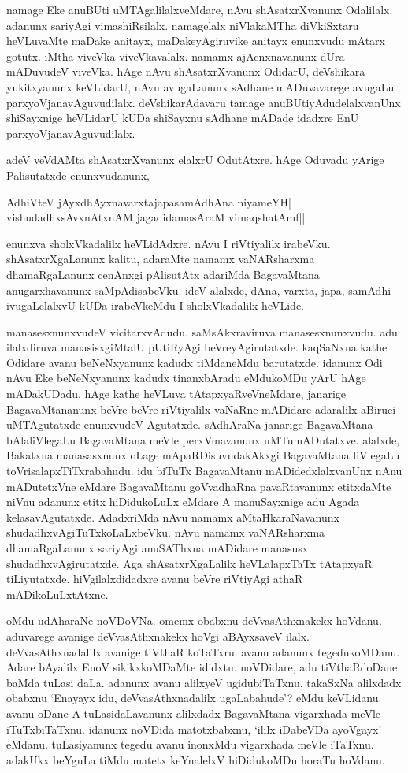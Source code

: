 namage Eke anuBUti uMTAgalilalxveMdare, nAvu shAsatxrXvanunx Odalilalx. adanunx sariyAgi vimashiRsilalx. namagelalx niVlakaMTha diVkiSxtaru heVLuvaMte maDake anitayx, maDakeyAgiruvike anitayx enunxvudu mAtarx gotutx. iMtha viveVka viveVkavalalx. namamx ajAcnxnavanunx dUra mADuvudeV viveVka. hAge nAvu shAsatxrXvanunx OdidarU, deVshikara yukitxyanunx keVLidarU, nAvu avugaLanunx sAdhane mADuvavarege avugaLu parxyoVjanavAguvudilalx. deVshikarAdavaru tamage anuBUtiyAdudelalxvanUnx shiSayxnige heVLidarU kUDa shiSayxnu sAdhane mADade idadxre EnU parxyoVjanavAguvudilalx.

adeV veVdAMta shAsatxrXvanunx elalxrU OdutAtxre. hAge Oduvadu yArige Palisutatxde enunxvudanunx,

\begin{shloka}
AdhiVteV jAyxdhAyxnavarxtajapasamAdhAna niyameYH|\\
vishudadhxsAvxnAtxnAM jagadidamasAraM vimaqshatAmf||
\end{shloka}

\noindent enunxva sholxVkadalilx heVLidAdxre. nAvu I riVtiyalilx irabeVku. shAsatxrXgaLanunx kalitu, adaraMte namamx vaNARsharxma dhamaRgaLanunx cenAnxgi pAlisutAtx adariMda BagavaMtana anugarxhavanunx saMpAdisabeVku. ideV alalxde, dAna, varxta, japa, samAdhi ivugaLelalxvU kUDa irabeVkeMdu I sholxVkadalilx heVLide.

manasesxnunxvudeV vicitarxvAdudu. saMsAkxraviruva manasesxnunxvudu. adu ilalxdiruva manasisxgiMtalU pUtiRyAgi beVreyAgirutatxde. kaqSaNxna kathe Odidare avanu beNeNxyanunx kadudx tiMdaneMdu barutatxde. idanunx Odi nAvu Eke beNeNxyanunx kadudx tinanxbAradu eMdukoMDu yArU hAge mADakUDadu. hAge kathe heVLuva tAtapxyaRveVneMdare, janarige BagavaMtananunx beVre beVre riVtiyalilx vaNaRne mADidare adaralilx aBiruci uMTAgutatxde enunxvudeV Agutatxde. sAdhAraNa janarige BagavaMtana bAlaliVlegaLu BagavaMtana meVle perxVmavanunx uMTumADutatxve. alalxde, Bakatxna manasasxnunx oLage mApaRDisuvudakAkxgi BagavaMtana liVlegaLu toVrisalapxTiTxrabahudu. idu biTuTx BagavaMtanu mADidedxlalxvanUnx nAnu mADutetxVne eMdare BagavaMtanu goVvadhaRna pavaRtavanunx etitxdaMte niVnu adanunx etitx hiDidukoLuLx eMdare A manuSayxnige adu Agada kelasavAgutatxde. AdadxriMda nAvu namamx aMtaHkaraNavanunx shudadhxvAgiTuTxkoLaLxbeVku. nAvu namamx vaNARsharxma dhamaRgaLanunx sariyAgi anuSAThxna mADidare manasusx shudadhxvAgirutatxde. Aga shAsatxrXgaLalilx heVLalapxTaTx tAtapxyaR tiLiyutatxde. hiVgilalxdidadxre avanu beVre riVtiyAgi athaR mADikoLuLxtAtxne.

oMdu udAharaNe noVDoVNa. omemx obabxnu deVvasAthxnakekx hoVdanu. aduvarege avanige deVvasAthxnakekx hoVgi aBAyxsaveV ilalx. deVvasAthxnadalilx avanige tiVthaR koTaTxru. avanu adanunx tegedukoMDanu. Adare bAyalilx EnoV sikikxkoMDaMte ididxtu. noVDidare, adu tiVthaRdoDane baMda tuLasi daLa. adanunx avanu alilxyeV ugidubiTaTxnu. takaSxNa alilxdadx obabxnu `Enayayx idu, deVvasAthxnadalilx ugaLabahude'? eMdu keVLidanu. avanu oDane A tuLasidaLavanunx alilxdadx BagavaMtana vigarxhada meVle iTuTxbiTaTxnu. idanunx noVDida matotxbabxnu, `ililx iDabeVDa ayoVgayx' eMdanu. tuLasiyanunx tegedu avanu inonxMdu vigarxhada meVle iTaTxnu. adakUkx beYguLa tiMdu matetx keYnalelxV hiDidukoMDu horaTu hoVdanu.

